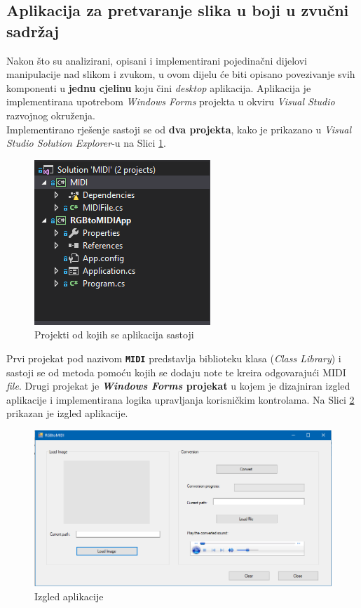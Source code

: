 \documentclass[12pt,a4paper]{article}
\begin{document}
\subsection{Aplikacija za pretvaranje slika u boji u zvučni sadržaj}

Nakon što su analizirani, opisani i implementirani pojedinačni dijelovi manipulacije nad slikom i zvukom, u ovom dijelu će biti opisano povezivanje svih komponenti u \textbf{jednu cjelinu} koju čini \textit{desktop} aplikacija. Aplikacija je implementirana upotrebom \textit{Windows Forms} projekta u okviru \textit{Visual Studio} razvojnog okruženja. \\
Implementirano rješenje sastoji se od \textbf{dva projekta}, kako je prikazano u \textit{Visual Studio Solution Explorer}-u na Slici \ref{solution}.

\begin{figure}[H]

\center
\includegraphics[scale=0.7]{../res/solution.png}
\caption{Projekti od kojih se aplikacija sastoji}
\label{solution}

\end{figure}

Prvi projekat pod nazivom \textbf{\texttt{MIDI}} predstavlja biblioteku klasa (\textit{Class Library}) i sastoji se od metoda pomoću kojih se dodaju note te kreira odgovarajući MIDI \textit{file}. Drugi projekat je \textbf{\textit{Windows Forms} projekat} u kojem je dizajniran izgled aplikacije i implementirana logika upravljanja korisničkim kontrolama. Na Slici \ref{app} prikazan je izgled aplikacije.

\begin{figure}[H]

\center
\includegraphics[scale=0.65]{../res/app.png}
\caption{Izgled aplikacije}
\label{app}

\end{figure}
\end{document}
